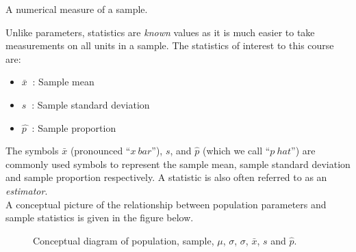 \begin{definition}[Statistic]		
A numerical measure of a sample.
\end{definition}

Unlike parameters, statistics are \textit{known} values as it is much easier to take measurements on all units in a sample. The statistics of interest to this course are:

\begin{itemize}
	\item	$\bar{x} \>$	: Sample mean
	\item	$s \>$		: Sample standard deviation
	\item	$\hat{p \>}$	: Sample proportion
	\end{itemize}

\noindent
The symbols $\bar{x}$ (pronounced ``$x~bar$''), $s$, and 
$\hat{p}$ (which we call ``$p~hat$'') are 
commonly used symbols to represent the sample mean, 
sample standard deviation and sample proportion respectively.
A statistic is also often referred to as an \textit{estimator}.\\

A conceptual picture of the relationship between population parameters and sample statistics is given in the figure below.

\hfill

\begin{figure}[H]
\begin{center}
\end{center}
\caption{Conceptual diagram of population, sample, $\mu$, $\sigma$, $\sigma$, 
$\bar{x}$, $s$ and $\hat{p}$.}
\end{figure}

